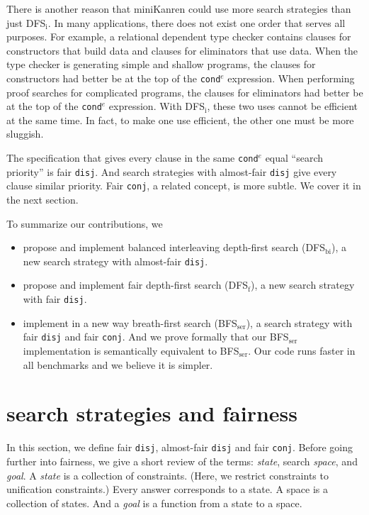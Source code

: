 \documentclass[format=acmlarge, review=true, authordraft=true]{acmart}
\newcommand{\conde}{\texttt{cond$^e$}}
\newcommand{\conj}{\texttt{conj}}
\newcommand{\disj}{\texttt{disj}}
\newcommand{\DFSi }[0]{DFS$_\textrm{i}$}
\newcommand{\DFSf }[0]{DFS$_\textrm{f}$}
\newcommand{\DFSbi}[0]{DFS$_\textrm{bi}$}
\newcommand{\BFSser}[0]{BFS$_\textrm{ser}$}
\begin{document}
There is another reason that miniKanren could use more search strategies than
just \DFSi. In many applications, there does not exist one order that serves all
purposes. For example, a relational dependent type checker contains
clauses for constructors that build data and clauses for eliminators that use
data. When the type checker is generating simple and shallow programs,
the clauses for constructors had better be at the top of the
\conde{} expression.
When performing proof searches for complicated programs, the clauses for 
eliminators had better be at the top of the \conde{} expression. With \DFSi, 
these two uses cannot be efficient at the same time. In fact, to make one use 
efficient, the other one must be more sluggish.

The specification that gives every clause in the same \conde{} equal 
``search priority'' is fair \disj{}. And search strategies with 
almost-fair \disj{} give every clause similar priority. 
Fair \conj{}, a related concept, is more subtle. We cover it in the next 
section.

To summarize our contributions, we
\begin{itemize}
	\item propose and implement balanced interleaving depth-first search 
	(\DFSbi{}), a new search strategy with almost-fair \disj{}.
	\item propose and implement fair depth-first search (\DFSf{}), a 
	new search strategy with fair \disj{}.
	\item implement in a new way breath-first search (\BFSser), a search 
strategy with fair \disj{} and fair \conj{}. And we prove formally that our 
\BFSser{} implementation is semantically equivalent to \BFSser{}.
Our code runs faster in all benchmarks and we believe it is simpler.
\end{itemize}

\section{search strategies and fairness}

In this section, we define fair \disj{}, almost-fair \disj{} and fair \conj{}. 
Before going further into fairness, we give a short review of the terms:
\emph{state}, search \emph{space}, and \emph{goal}.
A \emph{state} is a collection of constraints. (Here, we restrict 
constraints to unification constraints.) Every answer corresponds to a 
state. A space is a collection of states. And a \emph{goal} is a 
function from a state to a space.
\end{document}
